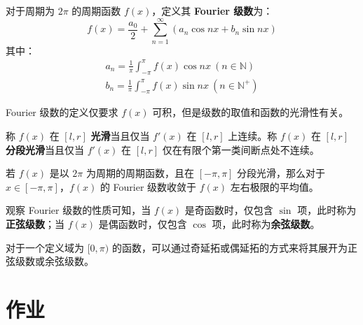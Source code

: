 \begin{definition}[Fourier 级数]
    对于周期为 $2\pi$ 的周期函数 $f(x)$，定义其 \textbf{Fourier 级数}为：
    $$
    f(x) = \frac{a_0}{2} + \sum_{n = 1}^{\infty} (a_n \cos n x + b_n \sin n x)
    $$
    其中：
    $$
    \begin{gathered}
        a_n = \frac{1}{\pi} \int_{-\pi}^{\pi} f(x) \cos n x\ (n \in \mathbb{N}) \\
        b_n = \frac{1}{\pi} \int_{-\pi}^{\pi} f(x) \sin n x\ (n \in \mathbb{N}^+)
    \end{gathered}
    $$
\end{definition}

Fourier 级数的定义仅要求 $f(x)$ 可积，但是级数的取值和函数的光滑性有关。

\begin{definition}[光滑]
    称 $f(x)$ 在 $[l, r]$ \textbf{光滑}当且仅当 $f'(x)$ 在 $[l, r]$ 上连续。称 $f(x)$ 在 $[l, r]$ \textbf{分段光滑}当且仅当 $f'(x)$ 在 $[l, r]$ 仅在有限个第一类间断点处不连续。
\end{definition}

\begin{theorem}[Dirichlet 定理]
    若 $f(x)$ 是以 $2\pi$ 为周期的周期函数，且在 $[-\pi, \pi]$ 分段光滑，那么对于 $x \in [-\pi, \pi]$，$f(x)$ 的 Fourier 级数收敛于 $f(x)$ 左右极限的平均值。
\end{theorem}

观察 Fourier 级数的性质可知，当 $f(x)$ 是奇函数时，仅包含 $\sin$ 项，此时称为\textbf{正弦级数}；当 $f(x)$ 是偶函数时，仅包含 $\cos$ 项，此时称为\textbf{余弦级数}。

对于一个定义域为 $[0, \pi)$ 的函数，可以通过奇延拓或偶延拓的方式来将其展开为正弦级数或余弦级数。

\section{作业}


